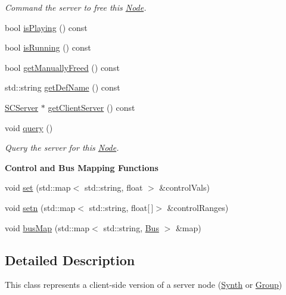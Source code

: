 \begin{DoxyCompactItemize}
\begin{DoxyCompactList}\small\item\em Command the server to free this \hyperlink{classsc_1_1Node}{Node}. \end{DoxyCompactList}\item 
bool \hyperlink{classsc_1_1Node_a551ece6304c94df930d59bc6fe13b6ba}{is\-Playing} () const 
\item 
bool \hyperlink{classsc_1_1Node_a3aa0c120ba5a7983e7b0e2f8ba6ace73}{is\-Running} () const 
\item 
bool \hyperlink{classsc_1_1Node_afc9868d6f3186648f4ab178929531003}{get\-Manually\-Freed} () const 
\item 
std\-::string \hyperlink{classsc_1_1Node_a7b6432f40057dc5f8f4d860defe3889a}{get\-Def\-Name} () const 
\item 
\hyperlink{classsc_1_1SCServer}{S\-C\-Server} $\ast$ \hyperlink{classsc_1_1Node_ae62cc58163364d644cfa9df669594d4f}{get\-Client\-Server} () const 
\item 
\hypertarget{classsc_1_1Node_a349c4d4891b78f7a495d4b646feae3a1}{void \hyperlink{classsc_1_1Node_a349c4d4891b78f7a495d4b646feae3a1}{query} ()}\label{classsc_1_1Node_a349c4d4891b78f7a495d4b646feae3a1}

\begin{DoxyCompactList}\small\item\em Query the server for this \hyperlink{classsc_1_1Node}{Node}. \end{DoxyCompactList}\end{DoxyCompactItemize}
\begin{Indent}{\bf Control and Bus Mapping Functions}\par
\begin{DoxyCompactItemize}
\item 
void \hyperlink{classsc_1_1Node_af29f544918afd0a212450c189e525224}{set} (std\-::map$<$ std\-::string, float $>$ \&control\-Vals)
\item 
void \hyperlink{classsc_1_1Node_a66e25d5cdfe57e7b9930a121fcc1d3ce}{setn} (std\-::map$<$ std\-::string, float\mbox{[}$\,$\mbox{]}$>$ \&control\-Ranges)
\item 
void \hyperlink{classsc_1_1Node_ac1c3c7c888c46c4f731862871d2dea7b}{bus\-Map} (std\-::map$<$ std\-::string, \hyperlink{classsc_1_1Bus}{Bus} $>$ \&map)
\end{DoxyCompactItemize}
\end{Indent}


\subsection{Detailed Description}
This class represents a client-\/side version of a server node (\hyperlink{classsc_1_1Synth}{Synth} or \hyperlink{classsc_1_1Group}{Group}) 

